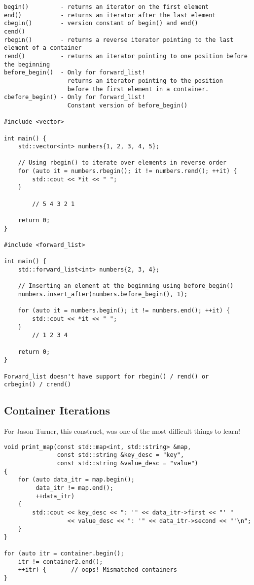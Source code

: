 \documentclass[openany]{report}
\begin{document}
\begin{verbatim}
begin()         - returns an iterator on the first element 
end()           - returns an iterator after the last element
cbegin()        - version constant of begin() and end()
cend()  
rbegin()        - returns a reverse iterator pointing to the last element of a container
rend()          - returns an iterator pointing to one position before the beginning
before_begin()  - Only for forward_list! 
                  returns an iterator pointing to the position
                  before the first element in a container.  
cbefore_begin() - Only for forward_list!
                  Constant version of before_begin()

#include <vector>

int main() {
    std::vector<int> numbers{1, 2, 3, 4, 5};

    // Using rbegin() to iterate over elements in reverse order
    for (auto it = numbers.rbegin(); it != numbers.rend(); ++it) {
        std::cout << *it << " ";
    }

        // 5 4 3 2 1

    return 0;
}

#include <forward_list>

int main() {
    std::forward_list<int> numbers{2, 3, 4};

    // Inserting an element at the beginning using before_begin()
    numbers.insert_after(numbers.before_begin(), 1);

    for (auto it = numbers.begin(); it != numbers.end(); ++it) {
        std::cout << *it << " ";
    }
        // 1 2 3 4

    return 0;
}

Forward_list doesn't have support for rbegin() / rend() or
crbegin() / crend()
\end{verbatim}

\subsection{Container Iterations}

For Jason Turner, this construct, was one of the most difficult things to learn!

\begin{verbatim}
void print_map(const std::map<int, std::string> &map,
               const std::string &key_desc = "key",
               const std::string &value_desc = "value")
{
    for (auto data_itr = map.begin();
         data_itr != map.end();
         ++data_itr)
    {
        std::cout << key_desc << ": '" << data_itr->first << "' "
                  << value_desc << ": '" << data_itr->second << "'\n";
    }
}

for (auto itr = container.begin();
    itr != container2.end();
    ++itr) {       // oops! Mismatched containers
}
\end{verbatim}
\end{document}
